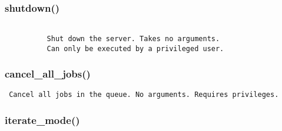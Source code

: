 \subsubsection{shutdown()}


\begin{verbatim}

          Shut down the server. Takes no arguments. 
          Can only be executed by a privileged user. 
\end{verbatim}
\subsubsection{cancel\_all\_jobs()}


\begin{verbatim}
 Cancel all jobs in the queue. No arguments. Requires privileges. 
\end{verbatim}
\subsubsection{iterate\_mode()}


